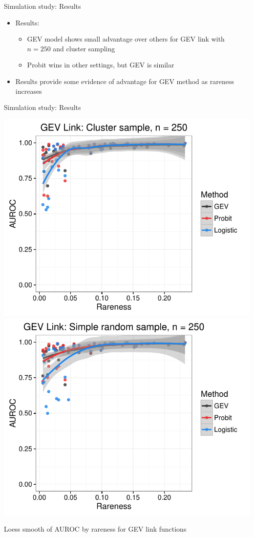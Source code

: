 \documentclass{beamer}
\begin{document}
\begin{frame}{Simulation study: Results}
	\begin{itemize} \setlength{\itemsep}{1em}
		\item Results: \vspace{0.5em}
		\begin{itemize} \setlength{\itemsep}{0.5em}
			\item GEV model shows small advantage over others for GEV link with $n = 250$ and cluster sampling
			\item Probit wins in other settings, but GEV is similar
		\end{itemize}
		\item Results provide some evidence of advantage for GEV method as rareness increases
	\end{itemize}
\end{frame}

\begin{frame}{Simulation study: Results}
	\begin{center}
		\includegraphics[width=0.49\linewidth]{byrareness-3}
    \includegraphics[width=0.49\linewidth]{byrareness-4}

		Loess smooth of AUROC by rareness for GEV link functions
	\end{center}
\end{frame}
\end{document}

